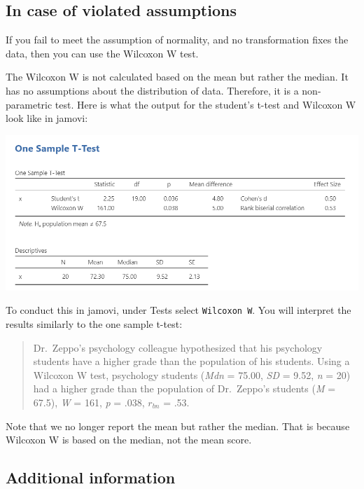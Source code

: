 \documentclass[
]{book}
\begin{document}
\hypertarget{in-case-of-violated-assumptions}{%
\subsection{In case of violated assumptions}\label{in-case-of-violated-assumptions}}

If you fail to meet the assumption of normality, and no transformation fixes the data, then you can use the Wilcoxon W test.

The Wilcoxon W is not calculated based on the mean but rather the median. It has no assumptions about the distribution of data. Therefore, it is a non-parametric test. Here is what the output for the student's t-test and Wilcoxon W look like in jamovi:

\includegraphics{images/07.1-one_sample_t-test/wilcoxon.png}

To conduct this in jamovi, under Tests select \texttt{Wilcoxon\ W}. You will interpret the results similarly to the one sample t-test:

\begin{quote}
Dr.~Zeppo's psychology colleague hypothesized that his psychology students have a higher grade than the population of his students. Using a Wilcoxon W test, psychology students (\emph{Mdn} = 75.00, \emph{SD} = 9.52, \emph{n} = 20) had a higher grade than the population of Dr.~Zeppo's students (\emph{M} = 67.5), \emph{W} = 161, \emph{p} = .038, \(r_{bn}\) = .53.
\end{quote}

Note that we no longer report the mean but rather the median. That is because Wilcoxon W is based on the median, not the mean score.

\hypertarget{additional-information}{%
\subsection{Additional information}\label{additional-information}}
\end{document}

